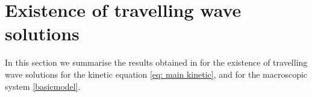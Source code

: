 \documentclass[11pt,twoside]{article}
\theoremstyle{nonumberplain}
\DeclareMathOperator{\sign}{sign}
\begin{document}

\section{Existence of travelling wave solutions}

In this section we summarise the results obtained in \cite{calvez2016chemotactic} for the existence of travelling wave solutions for the kinetic equation \eqref{eq: main kinetic},  and for the macroscopic system \eqref{basicmodel}.
\end{document}
